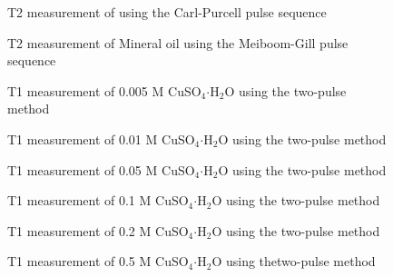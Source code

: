 \documentclass[
reprint,
amsmath,amssymb,
aps,
tikz,
border=5pt
]{revtex4-1}
\begin{document}
  \begin{figure}[h]
    \resizebox{0.45\textwidth}{!}{}
    \caption{T2 measurement of  using the Carl-Purcell pulse sequence }
    \label{fig:mo_cp}
  \end{figure}

  \begin{figure}[h]
    \resizebox{0.45\textwidth}{!}{}
    \caption{T2 measurement of Mineral oil using the Meiboom-Gill pulse sequence }
    \label{fig:mo_t2}
  \end{figure}

  
  \begin{figure}[h]
    \resizebox{0.45\textwidth}{!}{}
    \caption{T1 measurement of 0.005 M  CuSO$_{4} \boldsymbol{\cdot} $H$_2$O using the two-pulse method }
    \label{fig:0d005_t1}
  \end{figure}

  \begin{figure}[h]
    \resizebox{0.45\textwidth}{!}{}
    \caption{T1 measurement of 0.01 M  CuSO$_{4} \boldsymbol{\cdot} $H$_2$O using the two-pulse method }
    \label{fig:0d01_t1}
  \end{figure}

  \begin{figure}[h]
    \resizebox{0.45\textwidth}{!}{}
    \caption{T1 measurement of 0.05 M  CuSO$_{4} \boldsymbol{\cdot} $H$_2$O using the two-pulse method }
    \label{fig:0d05_t1}
  \end{figure}

  \begin{figure}[h]
    \resizebox{0.45\textwidth}{!}{}
    \caption{T1 measurement of 0.1 M  CuSO$_{4} \boldsymbol{\cdot} $H$_2$O using the two-pulse method }
    \label{fig:0d1_t1}
  \end{figure}

  \begin{figure}[h]
    \resizebox{0.45\textwidth}{!}{}
    \caption{T1 measurement of 0.2 M  CuSO$_{4} \boldsymbol{\cdot} $H$_2$O using the two-pulse method }
    \label{fig:0d2_t1}
  \end{figure}

  \begin{figure}[h]
    \resizebox{0.45\textwidth}{!}{}
    \caption{T1 measurement of 0.5 M  CuSO$_{4} \boldsymbol{\cdot} $H$_2$O using thetwo-pulse method }
    \label{fig:0d5_t1}
  \end{figure}
\end{document}
